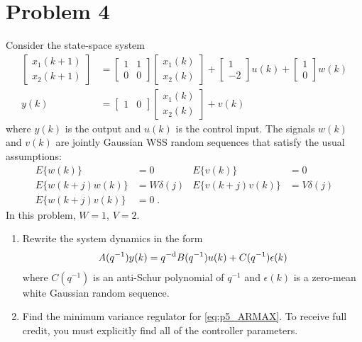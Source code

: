 \section*{Problem 4}

Consider the state-space system
\begin{align*}
    \begin{bmatrix}
            x_1(k+1) \\
            x_2(k+1)
        \end{bmatrix} & = \begin{bmatrix}
            1 & 1 \\
            0 & 0
        \end{bmatrix} \begin{bmatrix}
            x_1(k) \\
            x_2(k)
        \end{bmatrix} + \begin{bmatrix}
            1 \\
            -2
        \end{bmatrix} u(k) + \begin{bmatrix}
            1 \\
            0
        \end{bmatrix} w(k) \\
    y(k) & = \begin{bmatrix}
            1 & 0
        \end{bmatrix} \begin{bmatrix}
            x_1(k) \\
            x_2(k)
        \end{bmatrix} + v(k)
\end{align*}
where $y(k)$ is the output and $u(k)$ is the control input. The signals $w(k)$ and $v(k)$ are jointly Gaussian WSS random sequences that satisfy the usual assumptions:
\begin{align*}
    E \{ w(k) \} & = 0
        & E \{ v(k) \} & = 0 \\
    E \{ w(k+j) w(k) \} & = W \delta(j)
        & E \{ v(k+j) v(k) \} & = V \delta(j) \\
    E \{ w(k+j) v(k) \} & = 0 \; .
\end{align*}
In this problem, $W = 1$, $V = 2$.

\begin{enumerate}
    \item
    Rewrite the system dynamics in the form
    \begin{align}
        A(q^{-1}) y(k) = q^{-\textrm{d}} B(q^{-1}) u(k) + C(q^{-1}) \epsilon(k)
            \label{eq:p5_ARMAX}
    \end{align}
    where $C(q^{-1})$ is an anti-Schur polynomial of $q^{-1}$ and $\epsilon(k)$ is a zero-mean white Gaussian random sequence.

    \item
    Find the minimum variance regulator for \eqref{eq:p5_ARMAX}. To receive full credit, you must explicitly find all of the controller parameters.

\end{enumerate}



